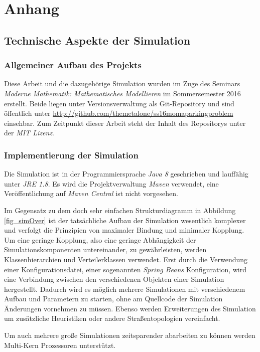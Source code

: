 \section*{Anhang}
\subsection*{Technische Aspekte der Simulation}\label{sec:ap_tec}
\subsubsection*{Allgemeiner Aufbau des Projekts}
Diese Arbeit und die dazugehörige Simulation wurden im Zuge des Seminars \emph{Moderne Mathematik: Mathematisches Modellieren} im Sommersemester 2016 erstellt. Beide liegen unter Versionsverwaltung als Git-Repository und sind öffentlich unter \url{http://github.com/themetalone/ss16momaparkingproblem} einsehbar. Zum Zeitpunkt dieser Arbeit steht der Inhalt des Repositorys unter der \emph{MIT Lizenz}.

\subsubsection*{Implementierung der Simulation}
Die Simulation ist in der Programmiersprache \emph{Java 8} geschrieben und lauffähig unter \emph{JRE 1.8}. Es wird die Projektverwaltung \emph{Maven} verwendet, eine Veröffentlichung auf \emph{Maven Central} ist nicht vorgesehen. 

Im Gegensatz zu dem doch sehr einfachen Strukturdiagramm in Abbildung \ref{fig_simOver} ist der tatsächliche Aufbau der Simulation wesentlich komplexer und verfolgt die Prinzipien von maximaler Bindung und minimaler Kopplung. Um eine geringe Kopplung, also eine geringe Abhängigkeit der Simulationskomponenten untereinander, zu gewährleisten, werden Klassenhierarchien und Verteilerklassen verwendet. Erst durch die Verwendung einer Konfigurationsdatei, einer sogenannten \emph{Spring Beans} Konfiguration, wird eine Verbindung zwischen den verschiedenen Objekten einer Simulation hergestellt. Dadurch wird es möglich mehrere Simulationen mit verschiedenem Aufbau und Parametern zu starten, ohne am Quellcode der Simulation Änderungen vornehmen zu müssen. Ebenso werden Erweiterungen des Simulation um zusätzliche Heuristiken oder andere Straßentopologien vereinfacht. 

Um auch mehrere große Simulationen zeitsparender abarbeiten zu können werden Multi-Kern Prozessoren unterstützt. 

